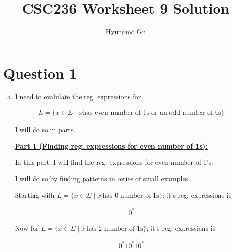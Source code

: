 \documentclass[12pt]{article}
\begin{document}
\title{CSC236 Worksheet 9 Solution}
\author{Hyungmo Gu}
\maketitle

\section*{Question 1}

\bigskip

\begin{enumerate}[a.]
    \item

    \setcounter{equation}{0}

    I need to evalulate the reg. expressions for

    \begin{align*}
        L = \{x \in \Sigma \mid x \text{has even number of 1s or an odd number of 0s}\}
    \end{align*}

    \bigskip

    I will do so in parts.

    \bigskip

    \underline{\textbf{Part 1 (Finding reg. expressions for even number of 1s):}}

    \bigskip

    In this part, I will find the reg. expressions for even number of 1's.

    \bigskip

    I will do so by finding patterns in series of small examples.

    \bigskip

    Starting with $L = \{x \in \Sigma \mid x\:\text{has 0 number of 1s}\}$,
    it's reg. expressions is

    \bigskip

    \begin{align}
        0^*
    \end{align}

    \bigskip

    Now for $L = \{x \in \Sigma \mid x\:\text{has 2 number of 1s}\}$,
    it's reg. expressions is

    \bigskip

    \begin{align}
        0^*10^*10^*
    \end{align}


    \bigskip


\end{enumerate}
\end{document}
